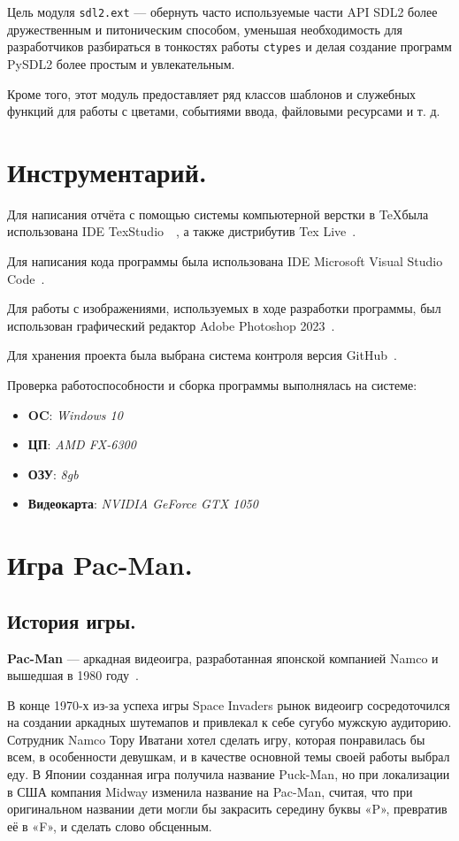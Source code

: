 Цель модуля \texttt{sdl2.ext} --- обернуть часто используемые части API SDL2 более дружественным и питоническим способом, уменьшая необходимость для разработчиков разбираться в тонкостях работы \texttt{ctypes} и делая создание программ PySDL2 более простым и увлекательным.

Кроме того, этот модуль предоставляет ряд классов шаблонов и служебных функций для работы с цветами, событиями ввода, файловыми ресурсами и т. д.


\section{\label{sec:ch01/sec03}Инструментарий.}
Для написания отчёта с помощью системы компьютерной верстки в \TeX была использована IDE TexStudio~\cite{texRUtexstud}~\cite{texENtexstud}, а также дистрибутив Tex Live~\cite{texRUtexlive}.

Для написания кода программы была использована IDE Microsoft Visual Studio Code~\cite{vscodeEN}.

Для работы с изображениями, используемых в ходе разработки программы, был использован графический редактор Adobe Photoshop 2023~\cite{adobeRU}.

Для хранения проекта была выбрана система контроля версия GitHub~\cite{wikiRUGitHub}.

Проверка работоспособности и сборка программы выполнялась на системе:
	\begin{itemize}
		\item \textbf{OC}: \textit{Windows 10}
		\item \textbf{ЦП}: \textit{AMD FX-6300}
		\item \textbf{ОЗУ}: \textit{8gb}
		\item \textbf{Видеокарта}: \textit{NVIDIA GeForce GTX 1050}
	\end{itemize}
	

\section{\label{sec:ch01/sec04}Игра Pac-Man.}
\subsection{\label{subsec:ch01/sec04/subsec01}История игры.}
\textbf{Pac-Man} --- аркадная видеоигра, разработанная японской компанией Namco и вышедшая в 1980 году~\cite{pacmanRU}.

В конце 1970-х из-за успеха игры Space Invaders рынок видеоигр сосредоточился на создании аркадных шутемапов и привлекал к себе сугубо мужскую аудиторию. Сотрудник Namco Тору Иватани хотел сделать игру, которая понравилась бы всем, в особенности девушкам, и в качестве основной темы своей работы выбрал еду. В Японии созданная игра получила название Puck-Man, но при локализации в США компания Midway изменила название на Pac-Man, считая, что при оригинальном названии дети могли бы закрасить середину буквы «P», превратив её в «F», и сделать слово обсценным.

